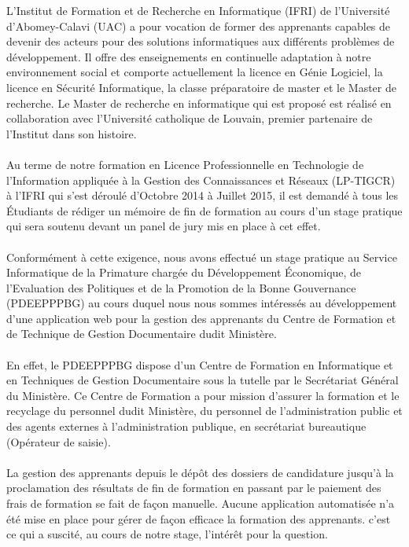 \introduction

L’Institut de Formation et de Recherche en Informatique (IFRI) de l’Université d’Abomey-Calavi (UAC) a pour vocation de former des apprenants capables de devenir des acteurs pour des solutions informatiques aux différents problèmes de développement. Il offre des enseignements en continuelle adaptation à notre environnement social et comporte actuellement la licence en Génie Logiciel, la licence en Sécurité Informatique, la classe préparatoire de master et le Master de recherche. Le Master de recherche en informatique qui est proposé est réalisé en collaboration avec l'Université catholique de Louvain, premier partenaire de l'Institut dans son histoire.
\paragraph{}
Au terme de notre formation en Licence Professionnelle en Technologie de l'Information appliquée à la Gestion des Connaissances et Réseaux (LP-TIGCR) à l'IFRI qui s'est déroulé d'Octobre 2014 à Juillet 2015, il est demandé à tous les Étudiants de rédiger un mémoire de fin de formation au cours d'un stage pratique qui sera soutenu devant un panel de jury mis en place à cet effet.
\paragraph{} 
Conformément à cette exigence, nous avons effectué un stage pratique au Service Informatique de la Primature chargée du Développement Économique, de l'Evaluation des Politiques et de la Promotion de la Bonne Gouvernance (PDEEPPPBG) au cours duquel nous nous sommes intéressés au développement d'une application web pour la gestion des apprenants du Centre de Formation et de Technique de Gestion Documentaire dudit Ministère.
\paragraph{}
En effet, le PDEEPPPBG dispose d'un Centre de Formation en Informatique et en Techniques de Gestion Documentaire sous la tutelle par le Secrétariat Général du Ministère. Ce Centre de Formation a pour mission d'assurer la formation et le recyclage du personnel dudit Ministère, du personnel de l'administration public et des agents externes à l'administration publique, en secrétariat bureautique (Opérateur de saisie).
\paragraph{}
La gestion des apprenants depuis le dépôt des dossiers de candidature jusqu'à la proclamation des résultats de fin de formation en passant par le paiement des frais de formation se fait de façon manuelle. Aucune application automatisée n'a été mise en place pour gérer de façon efficace la formation des apprenants. c'est ce qui a suscité, au cours de notre stage, l'intérêt pour la question.
